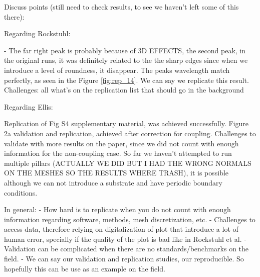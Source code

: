 Discuss points (still need to check results, to see we haven't left some of this there):

Regarding Rockstuhl:

- The far right peak is probably because of 3D EFFECTS, the second peak, in the original runs, it was definitely related to the the 
sharp edges since when we introduce a level of roundness, it disappear. The peaks wavelength match perfectly, as seen in the Figure 
\ref{fig:rep_14}. We can say we replicate this result. 
Challenges: all what's on the replication list that should go in the background 

Regarding Ellis:

Replication of Fig S4 supplementary material, was achieved successfully. 
Figure 2a validation and replication, achieved after correction for coupling. 
Challenges to validate with more results on the paper, since we did not count with enough 
information for the non-coupling case. So far we haven't attempted to run multiple pillars 
(ACTUALLY WE DID BUT I HAD THE WRONG NORMALS ON THE MESHES SO THE RESULTS WHERE TRASH), it is possible although we can not
introduce a substrate and have periodic boundary conditions.  


In general:
- How hard is to replicate when you do not count with enough information regarding software, methods, mesh discretization, etc. 
- Challenges to access data, therefore relying on digitalization of plot that introduce a lot of human error, specially if the quality 
of the plot is bad like in Rockstuhl et al. 
- Validation can be complicated when there are no standards/benchmarks on the field.
- We can say our validation and replication studies, our reproducible. So hopefully this can be use as
 an example on the field. 